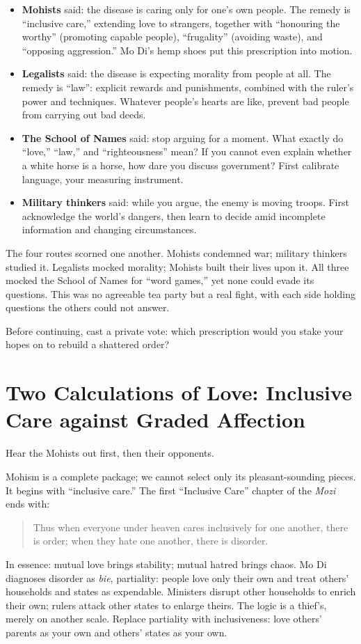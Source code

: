 \begin{itemize}
\item \textbf{Mohists} said: the disease is caring only for one's own people. The remedy is ``inclusive care,'' extending love to strangers, together with ``honouring the worthy'' (promoting capable people), ``frugality'' (avoiding waste), and ``opposing aggression.'' Mo Di's hemp shoes put this prescription into motion.
\item \textbf{Legalists} said: the disease is expecting morality from people at all. The remedy is ``law'': explicit rewards and punishments, combined with the ruler's power and techniques. Whatever people's hearts are like, prevent bad people from carrying out bad deeds.
\item \textbf{The School of Names} said: stop arguing for a moment. What exactly do ``love,'' ``law,'' and ``righteousness'' mean? If you cannot even explain whether a white horse is a horse, how dare you discuss government? First calibrate language, your measuring instrument.
\item \textbf{Military thinkers} said: while you argue, the enemy is moving troops. First acknowledge the world's dangers, then learn to decide amid incomplete information and changing circumstances.
\end{itemize}
The four routes scorned one another. Mohists condemned war; military thinkers studied it. Legalists mocked morality; Mohists built their lives upon it. All three mocked the School of Names for ``word games,'' yet none could evade its questions. This was no agreeable tea party but a real fight, with each side holding questions the others could not answer.

Before continuing, cast a private vote: which prescription would you stake your hopes on to rebuild a shattered order?

\section[Two Calculations of Love]{Two Calculations of Love: Inclusive Care against Graded Affection}
Hear the Mohists out first, then their opponents.

Mohism is a complete package; we cannot select only its pleasant-sounding pieces. It begins with ``inclusive care.'' The first ``Inclusive Care'' chapter of the \textit{Mozi} ends with:

\begin{quote}
Thus when everyone under heaven cares inclusively for one another, there is order; when they hate one another, there is disorder.
\end{quote}
In essence: mutual love brings stability; mutual hatred brings chaos. Mo Di diagnoses disorder as \textit{bie}, partiality: people love only their own and treat others' households and states as expendable. Ministers disrupt other households to enrich their own; rulers attack other states to enlarge theirs. The logic is a thief's, merely on another scale. Replace partiality with inclusiveness: love others' parents as your own and others' states as your own.

